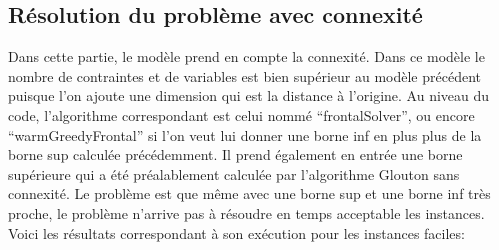 \documentclass[a4paper, 11pt]{article} %
\begin{document}
\begin{comment}
  $20\_25\_1$ &  & &  \\ \hline 
  $20\_25\_2$ &  & &  \\ \hline
  $20\_25\_3$ &  & &  \\ \hline
  $20\_25\_4$ &  & &  \\ \hline
  $20\_25\_5$ &  & &  \\ \hline
  $20\_25\_6$ &  & &  \\ \hline
  $20\_25\_7$ &  & &  \\ \hline
  $20\_25\_8$ &  & &  \\ \hline
  $20\_25\_9$ &  & &  \\ \hline
  $20\_25\_10$ &  & &  \\ \hline
  
  $25\_30\_1$ &  & &  \\ \hline
  $25\_30\_2$ &  & &  \\ \hline 
  $25\_30\_3$ &  & &  \\ \hline 
  $25\_30\_4$ &  & &  \\ \hline 
  $25\_30\_5$ &  & &  \\ \hline 
  $25\_30\_6$ &  & &  \\ \hline 
  $25\_30\_7$ &  & &  \\ \hline 
  $25\_30\_8$ &  & &  \\ \hline 
  $25\_30\_9$ &  & &  \\ \hline 
  $25\_30\_10$ &  & &  \\ \hline 
 
\end{tabular}
\end{center}
\end{comment}


\subsection{Résolution du problème avec connexité}

Dans cette partie, le modèle prend en compte la connexité. Dans ce modèle le nombre de contraintes et de variables est bien supérieur au modèle précédent puisque l'on ajoute une dimension qui est la distance à l'origine. Au niveau du code, l'algorithme correspondant est celui nommé ``frontalSolver'', ou encore ``warmGreedyFrontal'' si l'on veut lui donner une borne inf en plus plus de la borne sup calculée précédemment. Il prend également en entrée une borne supérieure qui a été préalablement calculée par l'algorithme Glouton sans connexité. Le problème est que même avec une borne sup et une borne inf très proche, le problème n'arrive pas à résoudre en temps acceptable les instances. Voici les résultats correspondant à son exécution pour les instances faciles:
\end{document}
